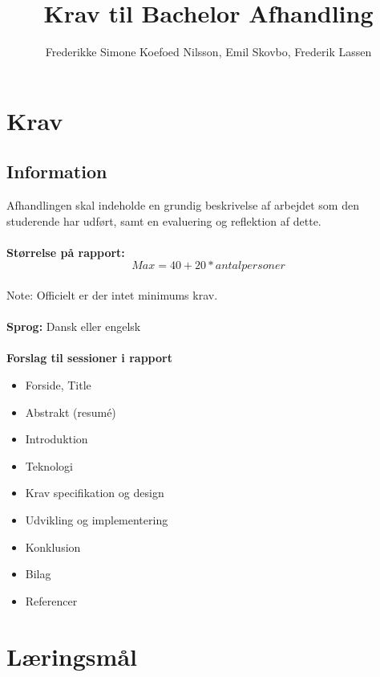 \documentclass[11pt]{article}
\begin{document}
\begin{titlepage}
\title{Krav til Bachelor Afhandling}
\author{Frederikke Simone Koefoed Nilsson, Emil Skovbo, Frederik Lassen}
\maketitle
\thispagestyle{empty} %
\end{titlepage}

\section{Krav}
\subsection{Information} 
Afhandlingen skal indeholde en grundig beskrivelse af arbejdet som den studerende har udført, samt en evaluering og reflektion af dette. \\ \\ 
\textbf{Størrelse på rapport:} $$Max = 40 + 20 * antalpersoner$$ \\
Note: Officielt er der intet minimums krav. \\ \\
\textbf{Sprog:} Dansk eller engelsk\\ \\
\textbf{Forslag til sessioner i rapport} \cite{cphbusinessBP} \\
\begin{itemize}
\item Forside, Title
\item Abstrakt (resumé)
\item Introduktion
\item Teknologi
\item Krav specifikation og design
\item Udvikling og implementering
\item Konklusion
\item Bilag
\item Referencer
\end{itemize}
\clearpage

\section{Læringsmål}
\end{document}
